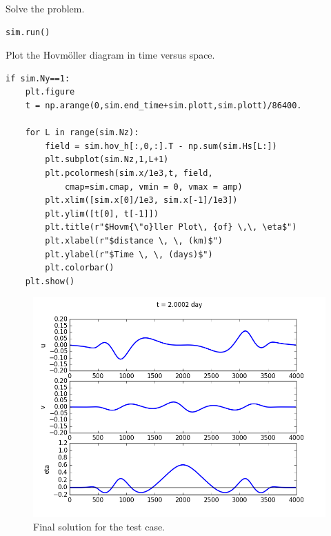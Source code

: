 \documentclass[11pt]{article}
\begin{document}
Solve the problem.
\begin{lstlisting}
sim.run()             
\end{lstlisting}

Plot the Hovm\"oller diagram in time versus space.
\begin{lstlisting}
if sim.Ny==1:
    plt.figure               
    t = np.arange(0,sim.end_time+sim.plott,sim.plott)/86400.
        
    for L in range(sim.Nz):
        field = sim.hov_h[:,0,:].T - np.sum(sim.Hs[L:])
        plt.subplot(sim.Nz,1,L+1)
        plt.pcolormesh(sim.x/1e3,t, field,
            cmap=sim.cmap, vmin = 0, vmax = amp)
        plt.xlim([sim.x[0]/1e3, sim.x[-1]/1e3])
        plt.ylim([t[0], t[-1]])
        plt.title(r"$Hovm{\"o}ller Plot\, {of} \,\, \eta$")
        plt.xlabel(r"$distance \, \, (km)$")
        plt.ylabel(r"$Time \, \, (days)$")
        plt.colorbar()
    plt.show()
\end{lstlisting}

\begin{figure}[h]
\begin{center}
\includegraphics[width=12cm]{Figures/ex1_fig1.png}
\caption{Final solution for the test case.}
\end{center}
\end{figure}
\end{document}
